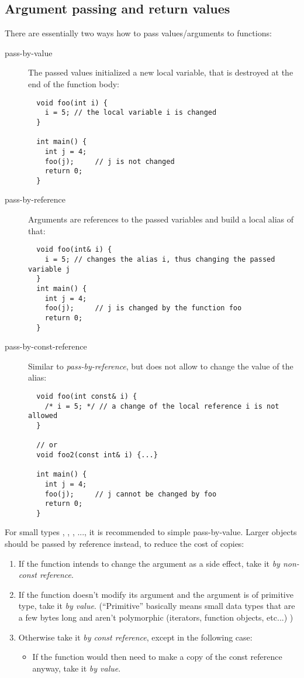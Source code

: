 \subsection{Argument passing and return values\label{sec:function-arguments}}
There are essentially two ways how to pass values/arguments to functions:
\begin{description}
  \item[pass-by-value] The passed values initialized a new local variable, that is destroyed at the end of the function body:
  \begin{verbatim}
  void foo(int i) {
    i = 5; // the local variable i is changed
  }

  int main() {
    int j = 4;
    foo(j);     // j is not changed
    return 0;
  }
  \end{verbatim}

  \item[pass-by-reference] Arguments are references to the passed variables and build a local alias of that:
  \begin{verbatim}
  void foo(int& i) {
    i = 5; // changes the alias i, thus changing the passed variable j
  }
  int main() {
    int j = 4;
    foo(j);     // j is changed by the function foo
    return 0;
  }
  \end{verbatim}

  \item[pass-by-const-reference] Similar to \emph{pass-by-reference}, but does not allow to change the value of the alias:
  \begin{verbatim}
  void foo(int const& i) {
    /* i = 5; */ // a change of the local reference i is not allowed
  }

  // or
  void foo2(const int& i) {...}

  int main() {
    int j = 4;
    foo(j);     // j cannot be changed by foo
    return 0;
  }
  \end{verbatim}
\end{description}

\begin{rem}
  For small types , \eg {}, , ..., it is recommended to simple pass-by-value. Larger objects should be passed by
  reference instead, to reduce the cost of copies:
  \begin{enumerate}[1)]
  \item If the function intends to change the argument as a side effect, take it \emph{by non-const reference}.
  \item If the function doesn't modify its argument and the argument is of primitive type, take it \emph{by value}. (``Primitive'' basically means
  small data types that are a few bytes long and aren't polymorphic (iterators, function objects, etc...) )
  \item Otherwise take it \emph{by const reference}, except in the following case:\begin{itemize}
        \item If the function would then need to make a copy of the const reference anyway, take it \emph{by value}.
  \end{itemize}
  \end{enumerate}
\end{rem}

